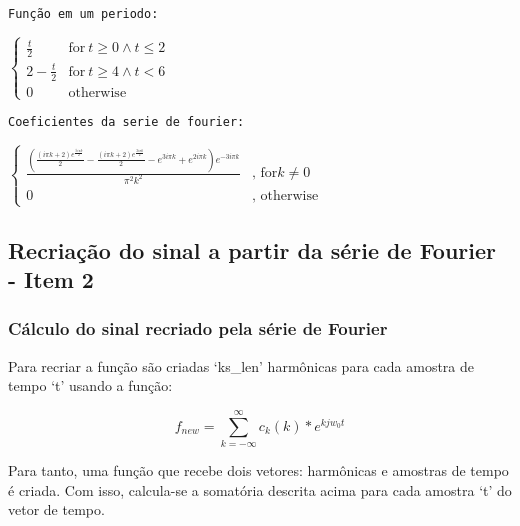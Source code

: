 \documentclass{article}
\begin{document}
    \begin{Verbatim}[commandchars=\\\{\}]
Função em um periodo:
    \end{Verbatim}

    $\displaystyle \begin{cases} \frac{t}{2} & \text{for}\: t \geq 0 \wedge t \leq 2 \\2 - \frac{t}{2} & \text{for}\: t \geq 4 \wedge t < 6 \\0 & \text{otherwise} \end{cases}$

    
    \begin{Verbatim}[commandchars=\\\{\}]
Coeficientes da serie de fourier:
    \end{Verbatim}

    $\displaystyle \begin{cases} \frac{\left(\frac{\left(i \pi k + 2\right) e^{\frac{5 i \pi k}{2}}}{2} - \frac{\left(i \pi k + 2\right) e^{\frac{3 i \pi k}{2}}}{2} - e^{3 i \pi k} + e^{2 i \pi k}\right) e^{- 3 i \pi k}}{\pi^{2} k^{2}} & \text{, for} k \neq 0  \\0 & \text{, otherwise} \end{cases}$

    
    \hypertarget{recriauxe7uxe3o-do-sinal-a-partir-da-suxe9rie-de-fourier---item-2}{%
\subsection{Recriação do sinal a partir da série de Fourier - Item
2}\label{recriauxe7uxe3o-do-sinal-a-partir-da-suxe9rie-de-fourier---item-2}}

    \hypertarget{cuxe1lculo-do-sinal-recriado-pela-suxe9rie-de-fourier}{%
\subsubsection{Cálculo do sinal recriado pela série de
Fourier}\label{cuxe1lculo-do-sinal-recriado-pela-suxe9rie-de-fourier}}

Para recriar a função são criadas `ks\_len' harmônicas para cada amostra
de tempo `t' usando a função:

\[ 
f_{new} =
\sum_{k = -\infty}^{\infty}
c_k(k) * e^{k j w_0 t}
\]

Para tanto, uma função que recebe dois vetores: harmônicas e amostras de
tempo é criada. Com isso, calcula-se a somatória descrita acima para
cada amostra `t' do vetor de tempo.
\end{document}
